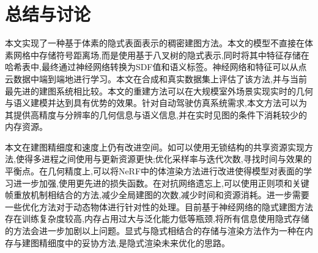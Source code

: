 \section{总结与讨论}\label{conclusion}

本文实现了一种基于体素的隐式表面表示的稠密建图方法。本文的模型不直接在体素网格中存储符号距离场,而是使用基于八叉树的隐式表示,同时将其中特征存储在哈希表中,最终通过神经网络转换为SDF值和语义标签。神经网络和特征可以从点云数据中端到端地进行学习。本文在合成和真实数据集上评估了该方法,并与当前最先进的建图系统相比较。本文的重建方法可以在大规模室外场景实现实时的几何与语义建模并达到具有优势的效果。针对自动驾驶仿真系统需求,本文方法可以为其提供高精度与分辨率的几何信息与语义信息,并在实时见图的条件下消耗较少的内存资源。

本文在建图精细度和速度上仍有改进空间。如可以使用无锁结构的共享资源实现方法,使得多进程之间使用与更新资源更快;优化采样率与迭代次数,寻找时间与效果的平衡点。在几何精度上,可以将NeRF中的体渲染方法进行改进使得模型对表面的学习进一步加强,使用更先进的损失函数。在对抗网络遗忘上,可以使用正则项和关键帧重放机制相结合的方法,减少全局建图的次数,减少时间和资源消耗。进一步需要一些优化方法对于动态物体进行针对性的处理。目前基于神经网络的隐式建图方法存在训练复杂度较高,内存占用过大与泛化能力低等瓶颈,将所有信息使用隐式存储的方法会进一步加剧以上问题。显式与隐式相结合的存储与渲染方法作为一种在内存与建图精细度中的妥协方法,是隐式渲染未来优化的思路。

